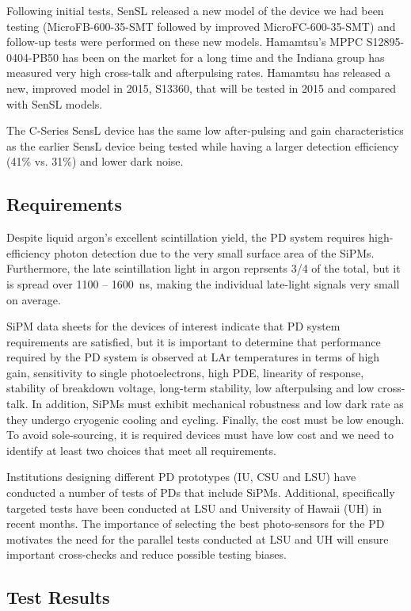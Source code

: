 Following initial tests, SenSL released a new model of the device we
had been testing (MicroFB-600-35-SMT followed by improved
MicroFC-600-35-SMT) and follow-up tests were performed on these new
models. Hamamtsu’s MPPC S12895- 0404-PB50 has been on the market for a
long time and the Indiana group has measured very high cross-talk and
afterpulsing rates. Hamamtsu has released a new, improved model in
2015, S13360, that will be tested in 2015 and compared with SenSL
models.

The C-Series SensL device has the same low after-pulsing and gain
characteristics as the earlier SensL device being tested while having
a larger detection efficiency (41\% vs. 31\%) and lower dark noise.  

\subsection{Requirements}

Despite liquid argon's excellent scintillation yield, the PD system
requires high-efficiency photon detection due to the very small
surface area of the SiPMs.  Furthermore, the late scintillation light
in argon reprsents 3/4 of the total, but it is spread over 1100 --
1600~ns, making the individual late-light signals very small on
average.

SiPM data sheets for the devices of interest indicate that PD system
requirements are satisfied, but it is important to determine that
performance required by the PD system is observed at LAr temperatures
in terms of high gain, sensitivity to single photoelectrons, high PDE,
linearity of response, stability of breakdown voltage, long-term
stability, low afterpulsing and low cross-talk. In addition, SiPMs
must exhibit mechanical robustness and low dark rate as they undergo
cryogenic cooling and cycling. Finally, the cost must be low
enough. To avoid sole-sourcing, it is required devices must have low
cost and we need to identify at least two choices that meet all
requirements.

Institutions designing different PD prototypes (IU, CSU and LSU) have
conducted a number of tests of PDs that include SiPMs. Additional,
specifically targeted tests have been conducted at LSU and University
of Hawaii (UH) in recent months. The importance of selecting the best
photo-sensors for the PD motivates the need for the parallel tests
conducted at LSU and UH will ensure important cross-checks and reduce
possible testing biases.

\subsection{Test Results}


